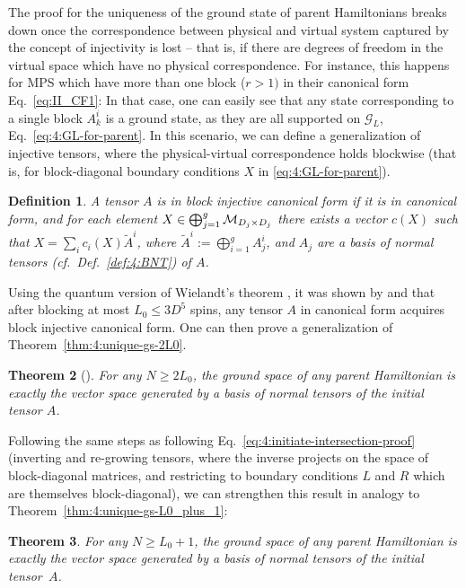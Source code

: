 \documentclass[rmp,aps,reprint,superscriptaddress,nobalancelastpage]{revtex4-1}
\newtheorem{thm}{Theorem}[section]
\newtheorem{defn}[thm]{Definition}
\begin{document}
    The proof for the uniqueness of the ground state of parent Hamiltonians breaks down once the correspondence between physical and virtual system captured by the concept of injectivity is lost -- that is, if there are degrees of freedom in the virtual space which have no physical correspondence.
    For instance, this happens for MPS which have more than one block ($r>1)$ in their  canonical form
    Eq.~\eqref{eq:II_CF1}: In that case, one can easily see that any state corresponding to a single block
$A_k^i$ is a ground state, as they are all supported on $\mathcal G_L$, Eq.~\eqref{eq:4:GL-for-parent}.
    In this scenario, we can define a generalization of injective tensors, where
    the physical-virtual correspondence holds blockwise (that is, for block-diagonal boundary conditions $X$ in \eqref{eq:4:GL-for-parent}).
    \begin{defn}
        A tensor $A$ is in \emph{block injective canonical form} if it is in canonical form, and for each element $X\in \bigoplus_{j=1}^g {\cal M}_{D_j\times D_j}$ there exists a vector $c(X)$ such that
        $X=\sum_i c_i(X) \tilde A^i$, where $\tilde A^i:=\bigoplus_{i=1}^g A^i_j$, and $A_j$ are a basis of normal tensors
        (cf.\ Def.~\ref{def:4:BNT}) of $A$.
    \end{defn}
    \noindent
    Using the quantum version of Wielandt's theorem \cite{sanz:wielandt}, it was shown by \citet{perez-garcia:mps-reps} and \citet{cirac:mpdo-rgfp}
    that after blocking at most $L_0\le 3D^5$ spins, any tensor $A$ in canonical form acquires block injective canonical form.  One can then  prove
    a generalization of Theorem~\ref{thm:4:unique-gs-2L0}.
    \begin{thm}[\citet{fannes:FCS,perez-garcia:mps-reps}]
        For any $N\ge 2L_0$, the ground space of any parent Hamiltonian is exactly the vector space generated by a basis of normal tensors  of the initial tensor $A$.
    \end{thm}
    Following the same steps as following Eq.~\eqref{eq:4:initiate-intersection-proof} (inverting and re-growing tensors, where the inverse projects on the space of block-diagonal matrices, and restricting to boundary conditions $L$ and $R$ which are themselves block-diagonal), we can strengthen this result in analogy to Theorem~\ref{thm:4:unique-gs-L0_plus_1}:
    \begin{thm}
        For any $N\ge L_0+1$, the ground space of any parent Hamiltonian is exactly the vector space generated by a basis of normal tensors  of the initial tensor~$A$.
    \end{thm}
\end{document}
